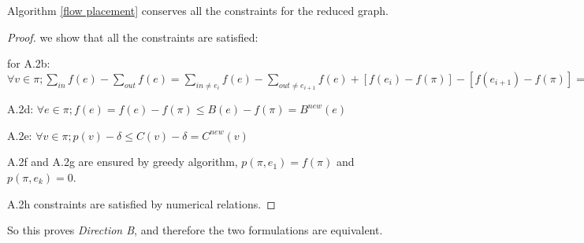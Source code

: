 \begin{lemma}  Algorithm \ref{flow placement} conserves all the constraints for the reduced graph.
\end{lemma}
\begin{proof}
we show that all the constraints are satisfied:

for A.2b:
$\forall v \in \pi; \sum\limits_{in}  f(e) - \sum\limits_{out} f(e)=\sum\limits_{in \not=e_i}  f(e) - \sum\limits_{out\not=e_{i+1} } f(e) +[f(e_i)-f(\pi) ] - [f(e_{i+1}) -f(\pi)] = 0 $

A.2d:
$\forall e \in \pi; f(e) = f(e)-f(\pi) \leq B(e)-f(\pi)=B^{new}(e)$ 

A.2e: 
$\forall v \in \pi; p(v) - \delta \leq C(v) - \delta=C^{new}(v)  $

A.2f and A.2g are ensured by greedy algorithm, $p(\pi, e_1) = f(\pi) $ and $p(\pi, e_k)=0$.

A.2h constraints are satisfied by numerical relations.
\end{proof}
So this proves \emph{Direction B}, and therefore the two formulations are equivalent. 


